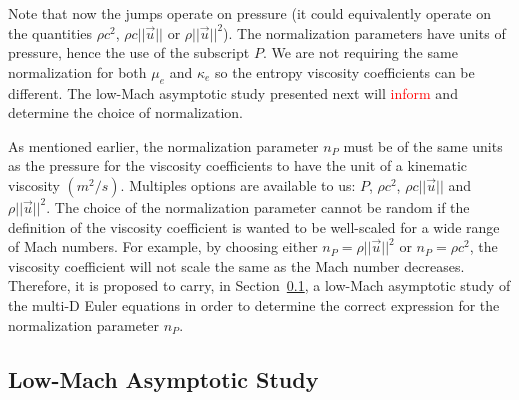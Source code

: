 \documentclass[preprint,10pt]{elsarticle}
\newcommand{\sct}[1]{Section~\ref{#1}}                   %
\newcommand{\tcr}[1]{\textcolor{red}{#1}}
\begin{document}
%
Note that now the jumps operate on pressure (it could equivalently operate on the quantities $\rho c^2$, $\rho c || \vec{u} ||$ or $\rho || \vec{u} ||^2$). The normalization parameters have units of pressure, hence the use of the subscript $P$. We are not requiring the same normalization for both $\mu_e$ and $\kappa_e$ so the entropy viscosity coefficients can be different. The low-Mach asymptotic study presented next will \tcr{inform} and determine the choice of normalization.

As mentioned earlier, the normalization parameter $n_P$ must be of the same units as the pressure for the viscosity coefficients to have the unit of a kinematic viscosity $(m^2 / s)$. Multiples options are available to us: $P$, $\rho c^2$, $\rho c || \vec{u} ||$ and $\rho || \vec{u} ||^2$. The choice of the normalization parameter cannot be random if the definition of the viscosity coefficient is wanted to be well-scaled for a wide range of Mach numbers. For example, by choosing either $n_P = \rho || \vec{u} ||^2$ or $n_P = \rho c^2$, the viscosity coefficient will not scale the same as the Mach number decreases. Therefore, it is proposed to carry, in \sct{sec:lowMach}, a low-Mach asymptotic study of the multi-D Euler equations in order to determine the correct expression for the normalization parameter $n_P$.

\subsection{Low-Mach Asymptotic Study} \label{sec:lowMach}
\end{document}
